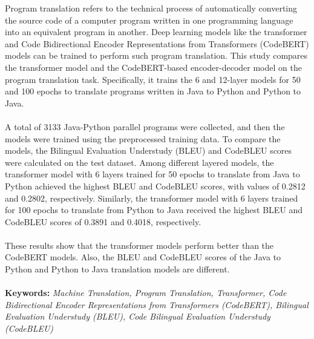 Program translation refers to the technical process of automatically converting the source code of a computer program written in one programming language into an equivalent program in another. Deep learning models like the transformer and Code Bidirectional Encoder Representations from Transformers (CodeBERT) models can be trained to perform such program translation. This study compares the transformer model and the CodeBERT-based encoder-decoder model on the program translation task. Specifically, it trains the 6 and 12-layer models for 50 and 100 epochs to translate programs written in Java to Python and Python to Java.
\\\\
A total of 3133 Java-Python parallel programs were collected, and then the models were trained using the preprocessed training data. To compare the models, the Bilingual Evaluation Understudy (BLEU) and CodeBLEU scores were calculated on the test dataset. Among different layered models, the transformer model with 6 layers trained for 50 epochs to translate from Java to Python achieved the highest BLEU and CodeBLEU scores, with values of 0.2812 and 0.2802, respectively. Similarly, the transformer model with 6 layers trained for 100 epochs to translate from Python to Java received the highest BLEU and CodeBLEU scores of 0.3891 and 0.4018, respectively.
\\\\
These results show that the transformer models perform better than the CodeBERT models. Also, the BLEU and CodeBLEU scores of the Java to Python and Python to Java translation models are different.
\\\\
\textbf{Keywords:} \textit{Machine Translation, Program Translation, Transformer, Code Bidirectional Encoder Representations from Transformers (CodeBERT), Bilingual Evaluation Understudy (BLEU), Code Bilingual Evaluation Understudy (CodeBLEU)}